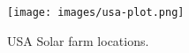 \begin{figure}[ht!]
\centering
\texttt{[image: images/usa-plot.png]}
\caption{USA Solar farm locations.}
\label{fig:usa-plot}
\end{figure}